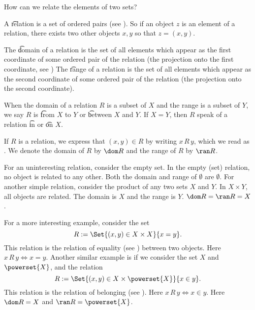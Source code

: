 

How can we relate the elements of two sets?


A \t{relation} is a set of ordered pairs (see ).
So if an object $z$ is an element of a relation, there exists two other objects $x, y$ so that $z = (x, y)$.

The \t{domain} of a relation is the set of all elements which appear as the first coordinate of some ordered pair of the relation (the projection onto the first coordinate, see )
The \t{range} of a relation is the set of all elements which appear as the second coordinate of some ordered pair of the relation (the projection onto the second coordinate).

When the domain of a relation $R$ is a subset of $X$ and the range is a subset of $Y$, we say $R$ is \t{from $X$ to $Y$} or \t{between} $X$ and $Y$.
If $X = Y$, then $R$ speak of a relation \t{in} or \t{on} $X$.

%


If $R$ is a relation, we express that $(x, y) \in R$ by writing $x\,R\,y$, which we read as .
We denote the domain of $R$ by $\dom R$ and the range of $R$ by $\ran R$.


For an uninteresting relation, consider the empty set.
In the empty (set) relation, no object is related to any other.
Both the domain and range of $\emptyset$ are $\emptyset$.
For another simple relation, consider the product of any two sets $X$ and $Y$.
In $X \times Y$, all objects are related.
The domain is $X$ and the range is $Y$.
$\dom R = \ran R = X$.

For a more interesting example, consider the set
\[
  R := \Set{(x, y) \in X \times X}{x = y}.
\]
This relation is the relation of equality (see ) between two objects.
Here $x\,R\,y \iff x = y$.
Another similar example is if we consider the set $X$ and $\powerset{X}$, and the relation
\[
  R := \Set{(x, y) \in X \times \powerset{X}}{x \in y}.
\]
This relation is the relation of belonging (see ).
Here $x\,R\,y \iff x \in y$.
Here $\dom R = X$ and $\ran R = \powerset{X}$.

